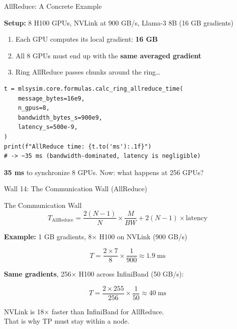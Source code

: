 \documentclass[aspectratio=169, 12pt]{beamer}
\newcommand{\wallbox}[2]{%
  \begin{block}{#1}#2\end{block}%
}
\begin{document}
\begin{frame}[fragile]{AllReduce: A Concrete Example}

\small
\textbf{Setup:} 8 H100 GPUs, NVLink at 900 GB/s, Llama-3 8B (16 GB gradients)

\vspace{0.3cm}
\begin{enumerate}
\item Each GPU computes its local gradient: \textbf{16 GB}
\item All 8 GPUs must end up with the \textbf{same averaged gradient}
\item Ring AllReduce passes chunks around the ring\ldots
\end{enumerate}

\vspace{0.3cm}
\begin{lstlisting}
t = mlsysim.core.formulas.calc_ring_allreduce_time(
    message_bytes=16e9,
    n_gpus=8,
    bandwidth_bytes_s=900e9,
    latency_s=500e-9,
)
print(f"AllReduce time: {t.to('ms'):.1f}")
# -> ~35 ms (bandwidth-dominated, latency is negligible)
\end{lstlisting}

\vfill
\centering
\textbf{35 ms} to synchronize 8 GPUs. Now: what happens at 256 GPUs?
\end{frame}

\begin{frame}{Wall 14: The Communication Wall (AllReduce)}

\small
\wallbox{The Communication Wall}{
\[
  T_{\text{AllReduce}} = \frac{2(N-1)}{N} \times \frac{M}{BW}
    + 2(N-1) \times \text{latency}
\]
}

\vspace{0.2cm}
\textbf{Example:} 1 GB gradients, 8$\times$ H100 on NVLink (900 GB/s)

\[
T = \frac{2 \times 7}{8} \times \frac{1}{900} \approx 1.9\;\text{ms}
\]

\vspace{0.2cm}
\textbf{Same gradients}, 256$\times$ H100 across InfiniBand (50 GB/s):

\[
T = \frac{2 \times 255}{256} \times \frac{1}{50} \approx 40\;\text{ms}
\]

\vspace{0.2cm}
\alert{NVLink is 18$\times$ faster than InfiniBand for AllReduce.\\
That is why TP must stay within a node.}
\end{frame}
\end{document}
